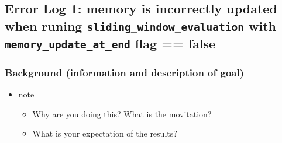 \documentclass[11pt]{article}
\begin{document}
\subsection{Error Log 1: memory is incorrectly updated when runing \texttt{sliding\_window\_evaluation} with \texttt{memory\_update\_at\_end} flag == false}
\label{sec:orgc272301}
\subsubsection{Background (information and description of goal)}
\label{sec:orgc0ae872}
\begin{itemize}
\item note
\begin{itemize}
\item Why are you doing this? What is the movitation?
\item What is your expectation of the results?
\end{itemize}
\end{itemize}
\end{document}
